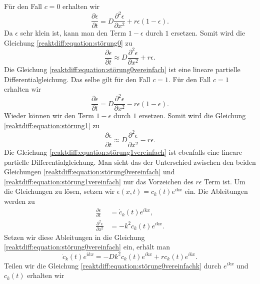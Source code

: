 Für den Fall \(c = 0\) erhalten wir
\begin{equation}
\label{reaktdiff:equation:störung0}
\frac{\partial \epsilon}{\partial t} = D \frac{\partial^2 \epsilon}{\partial x^2} + r\epsilon(1-\epsilon).
\end{equation}
Da \(\epsilon\) sehr klein ist, kann man den Term \(1-\epsilon\) durch \(1\) ersetzen.
Somit wird die Gleichung \ref{reaktdiff:equation:störung0} zu
\begin{equation}
\label{reaktdiff:equation:störung0vereinfach}
\frac{\partial \epsilon}{\partial t} \approx D \frac{\partial^2 \epsilon}{\partial x^2}  + r\epsilon.
\end{equation}
Die Gleichung \ref{reaktdiff:equation:störung0vereinfach} ist eine lineare partielle Differentialgleichung.
Das selbe gilt für den Fall \(c = 1\).
Für den Fall \(c = 1\) erhalten wir
\begin{equation}
\label{reaktdiff:equation:störung1}
\frac{\partial \epsilon}{\partial t} = D \frac{\partial^2 \epsilon}{\partial x^2} - r\epsilon(1-\epsilon).
\end{equation}
Wieder können wir den Term \(1-\epsilon\) durch \(1\) ersetzen.
Somit wird die Gleichung \ref{reaktdiff:equation:störung1} zu
\begin{equation}
\label{reaktdiff:equation:störung1vereinfach}
\frac{\partial \epsilon}{\partial t} \approx D \frac{\partial^2 \epsilon}{\partial x^2} - r\epsilon.
\end{equation}
Die Gleichung \ref{reaktdiff:equation:störung1vereinfach} ist ebenfalls eine lineare partielle Differentialgleichung.
Man sieht das der Unterschied zwischen den beiden Gleichungen \ref{reaktdiff:equation:störung0vereinfach} und \ref{reaktdiff:equation:störung1vereinfach} nur das Vorzeichen des \(r\epsilon\) Term ist.
Um die Gleichungen zu lösen, setzen wir \(\epsilon(x,t) = c_k(t) e^{ikx}\) ein.
Die Ableitungen werden zu
\begin{align*}
\frac{\partial \epsilon}{\partial t} &= \dot{c}_k(t) e^{ikx},\\
\frac{\partial^2 \epsilon}{\partial x^2} &= -k^2 c_k(t) e^{ikx}.
\end{align*}
Setzen wir diese Ableitungen in die Gleichung \ref{reaktdiff:equation:störung0vereinfach} ein, erhält man
\begin{equation}
\label{reaktdiff:equation:störung0vereinfachk}
\dot{c}_k(t) e^{ikx} = -D k^2 c_k(t) e^{ikx} + r c_k(t) e^{ikx}.
\end{equation}
Teilen wir die Gleichung \ref{reaktdiff:equation:störung0vereinfachk} durch \(e^{ikx}\) und \(c_k(t)\) erhalten wir
